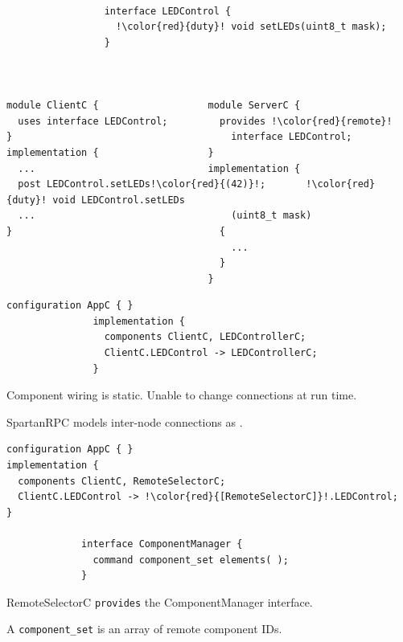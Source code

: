
{\small
\begin{lstlisting}[language=nesC, escapechar=!]

                 interface LEDControl {
                   !\color{red}{duty}! void setLEDs(uint8_t mask);
                 }



module ClientC {                   module ServerC {
  uses interface LEDControl;         provides !\color{red}{remote}!
}                                      interface LEDControl;
implementation {                   }
  ...                              implementation {
  post LEDControl.setLEDs!\color{red}{(42)}!;       !\color{red}{duty}! void LEDControl.setLEDs
  ...                                  (uint8_t mask)
}                                    {
                                       ...
                                     }
                                   }
\end{lstlisting} 
}
\stopslide



{\small
\begin{lstlisting}[language=nesC]
               configuration AppC { }
               implementation {
                 components ClientC, LEDControllerC;
                 ClientC.LEDControl -> LEDControllerC;
               }
\end{lstlisting}
}

\begin{citemize}
  \item Component wiring is static. Unable to change connections at run time.
  \item SpartanRPC models inter-node connections as .
\end{citemize}
\stopslide


{\small
\begin{lstlisting}[language=nesC, escapechar=!]
configuration AppC { }
implementation {
  components ClientC, RemoteSelectorC;
  ClientC.LEDControl -> !\color{red}{[RemoteSelectorC]}!.LEDControl;
}

             interface ComponentManager {
               command component_set elements( );
             }
\end{lstlisting}
}

\begin{citemize}
  \item RemoteSelectorC \lstinline{provides} the ComponentManager interface.
  \item A \lstinline{component_set} is an array of remote component IDs.
\end{citemize}
\stopslide

